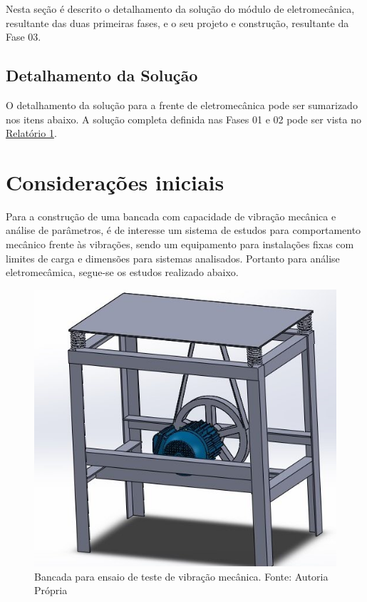  \label{desenvolvimento_eletromecanica}
Nesta seção é descrito o detalhamento da solução do módulo de eletromecânica, resultante das duas primeiras fases,
e o seu projeto e construção, resultante da Fase 03.

\subsection{Detalhamento da Solução}

O detalhamento da solução para a frente de eletromecânica pode ser sumarizado nos itens abaixo. A solução completa definida nas
  Fases 01 e 02 pode ser vista no \href{https://drive.google.com/file/d/0B5InkGKx6O-MR1B3eVYzZFpjQ3c/view?usp=sharing}{Relatório 1}.

\section{Considerações iniciais}

Para a construção de uma bancada com capacidade de vibração mecânica e análise de parâmetros, é de interesse um sistema de estudos para comportamento mecânico frente às vibrações, sendo um equipamento para instalações fixas com limites de carga e dimensões para sistemas analisados. Portanto para análise eletromecâmica, segue-se os estudos realizado abaixo.

\begin{figure}[h!]
	\centering
		\includegraphics[keepaspectratio=true,scale=0.6]{figuras/1.png}
	\caption{Bancada para ensaio de teste de vibração mecânica. Fonte: Autoria Própria}
    \label{bancada}
\end{figure}

